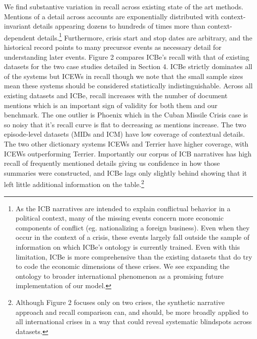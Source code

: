\documentclass{article}
\begin{document}
We find substantive variation in recall across existing state of the art
methods. Mentions of a detail across accounts are exponentially
distributed with context-invariant details appearing dozens to hundreds
of times more than context-dependent details.\footnote{As the ICB
  narratives are intended to explain conflictual behavior in a political
  context, many of the missing events concern more economic components
  of conflict (eg. nationalizing a foreign business). Even when they
  occur in the context of a crisis, these events largely fall outside
  the sample of information on which ICBe's ontology is currently
  trained. Even with this limitation, ICBe is more comprehensive than
  the existing datasets that do try to code the economic dimensions of
  these crises. We see expanding the ontology to broader international
  phenomenon as a promising future implementation of our model.}
Furthermore, crisis start and stop dates are arbitrary, and the
historical record points to many precursor events as necessary detail
for understanding later events. Figure 2 compares ICBe's recall with
that of existing datasets for the two case studies detailed in Section
4. ICBe strictly dominates all of the systems but ICEWs in recall though
we note that the small sample sizes mean these systems should be
considered statistically indistinguishable. Across all existing datasets
and ICBe, recall increases with the number of document mentions which is
an important sign of validity for both them and our benchmark. The one
outlier is Phoenix which in the Cuban Missile Crisis case is so noisy
that it's recall curve is flat to decreasing as mentions increase. The
two episode-level datasets (MIDs and ICM) have low coverage of
contextual details. The two other dictionary systems ICEWs and Terrier
have higher coverage, with ICEWs outperforming Terrier. Importantly our
corpus of ICB narratives has high recall of frequently mentioned details
giving us confidence in how those summaries were constructed, and ICBe
lags only slightly behind showing that it left little additional
information on the table.\footnote{Although Figure 2 focuses only on two
  crises, the synthetic narrative approach and recall comparison can,
  and should, be more broadly applied to all international crises in a
  way that could reveal systematic blindspots across datasets.}
\end{document}
